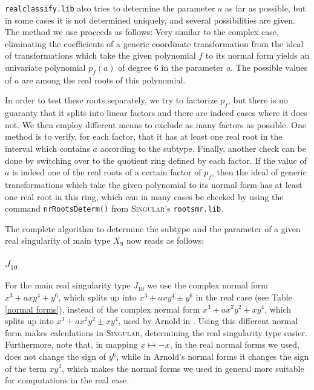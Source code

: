 \documentclass{amsproc}
\newcommand{\Singular}{\textsc{Singular}}
\newcommand{\realclassify}{\texttt{realclassify.lib}}
\begin{document}
\realclassify{} also tries to determine the parameter $a$ as far as possible,
but in some cases it is not determined uniquely, and several possibilities are
given. The method we use proceeds as follows: Very similar to the complex case,
eliminating the coefficients of a generic coordinate transformation from the
ideal of transformations which take the given polynomial $f$ to its normal form
yields an univariate polynomial $p_f(a)$ of degree 6 in the parameter $a$. The
possible values of $a$ are among the real roots of this polynomial.

In order to
test these roots separately, we try to factorize $p_f$, but there is no
guaranty that it splits into linear factors and there are indeed cases where it
does not. We then employ different means to exclude as many
factors as possible. One method is to verify, for each factor, that it has at
least one real root in the interval which contains $a$ according to the
subtype. Finally, another check can be done by switching over to the
quotient ring defined by each factor. If the value of $a$ is indeed one of the
real roots of a certain factor of $p_f$, then the ideal of generic
transformations which take the given polynomial to its normal form has at least
one real root in this ring, which can in many cases be checked by using the
command \texttt{nrRootsDeterm()} from \Singular{}'s \texttt{rootsmr.lib}.

The complete algorithm to determine the subtype and the parameter of a given
real singularity of main type $X_9$ now reads as follows:


\subsubsection{$J_{10}$}
For the main real singularity type $J_{10}$ we use the complex normal form $x^3+axy^4+ y^6$, which splits up into $x^3+axy^4\pm y^6$ in the real case (see Table \ref{normal forms}),  instead of the complex normal form $x^3+ax^2y^2+xy^4$, which splits up into $x^3+ax^2y^2\pm xy^4$, used by Arnold in \cite{AVG1985}. Using this different normal form makes calculations in \textsc{Singular}, determining the real singularity type easier. Furthermore, note that, in mapping $x\mapsto -x$, in the real normal forms we used, does not change the sign of $y^6$, while in Arnold's normal forms it changes the sign of the term $xy^4$, which makes the normal forms we used in general more suitable for computations in  the real case.
\end{document}
